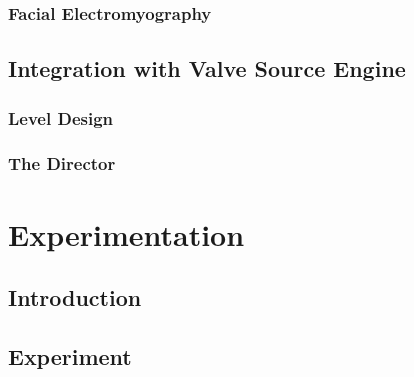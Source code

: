 \documentclass{uofsthesis-cs}
\begin{document}
\subsection{Facial Electromyography}


\section{Integration with Valve Source Engine}
\subsection{Level Design}
\subsection{The Director}



\chapter{Experimentation}
\label{chap:exprm}


\section{Introduction}

\section{Experiment}
\end{document}
